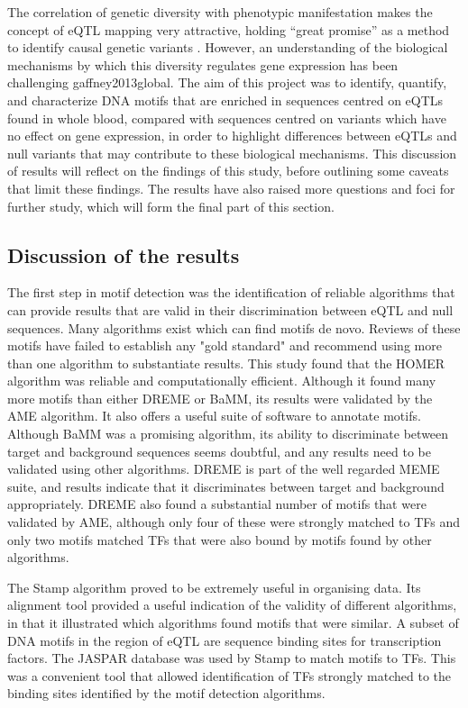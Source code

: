 \documentclass[12pt]{article}
\begin{document}
The correlation of genetic diversity with phenotypic manifestation makes the concept of eQTL mapping very attractive⁠, holding “great promise” as a method to identify causal genetic variants \citep{Pai2015}⁠. However, an understanding of the biological mechanisms by which this diversity regulates gene expression has been challenging \citep{Pai2015}{gaffney2013global}⁠. The aim of this project was to identify, quantify, and characterize DNA motifs that are enriched in sequences centred on eQTLs found in whole blood, compared with sequences centred on variants which have no effect on gene expression, in order to highlight differences between eQTLs and null variants that may contribute to these biological mechanisms. This discussion of results will reflect on the findings of this study, before outlining some caveats that limit these findings. The results have also raised more questions and foci for further study, which will form the final part of this section.

\subsection{Discussion of the results}

The first step in motif detection was the identification of reliable algorithms that can provide results that are valid in their discrimination between eQTL and null sequences. Many algorithms exist which can find motifs de novo. Reviews of these motifs have failed to establish any "gold standard" and \citet{tran2014survey} recommend using more than one algorithm to substantiate results. This study found that the HOMER algorithm was reliable and computationally efficient. Although it found many more motifs than either DREME or BaMM, its results were validated by the AME algorithm. It also offers a useful suite of software to annotate motifs. Although BaMM was a promising algorithm, its ability to discriminate between target and background sequences seems doubtful, and any results need to be validated using other algorithms. DREME is part of the well regarded MEME suite, and results indicate that it discriminates between target and background appropriately. DREME also found a substantial number of motifs that were validated by AME, although only four of these were strongly matched to TFs and only two motifs matched TFs that were also bound by motifs found by other algorithms.

The Stamp algorithm proved to be extremely useful in organising data. Its alignment tool provided a useful indication of the validity of different algorithms, in that it illustrated which algorithms found motifs that were similar. A subset of DNA motifs in the region of eQTL are sequence binding sites for transcription factors. The JASPAR database \citep{Mathelier2016} was used by Stamp to match motifs to TFs. This was a convenient tool that allowed identification of TFs strongly matched to the binding sites identified by the motif detection algorithms. 
\end{document}
